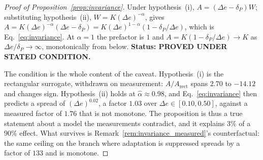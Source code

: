 \begin{proof}[Proof of Proposition~\ref{prop:invariance}]
  Under hypothesis~(i), $A = (\Delta e - \delta_P)W$; substituting
  hypothesis~(ii), $W = K(\Delta e)^{-\alpha}$, gives
  $A = K(\Delta e)^{-\alpha}(\Delta e - \delta_P) =
  K(\Delta e)^{1-\alpha}(1 - \delta_P/\Delta e)$, which is
  Eq.~\eqref{eq:invariance}. At $\alpha = 1$ the prefactor is $1$ and
  $A = K(1 - \delta_P/\Delta e) \to K$ as $\Delta e/\delta_P \to \infty$,
  monotonically from below. \textbf{Status: PROVED UNDER STATED CONDITION.}

  The condition is the whole content of the caveat. Hypothesis~(i) is the
  rectangular surrogate, withdrawn on measurement: $A/A_{\mathrm{rect}}$ spans
  $2.70$ to $-14.12$ and changes sign. Hypothesis~(ii) holds at
  $\hat\alpha \approx 0.98$, and Eq.~\eqref{eq:invariance} then predicts a
  spread of $(\Delta e)^{0.02}$, a factor $1.03$ over
  $\Delta e \in [0.10, 0.50]$, against a measured factor of $1.76$ that is not
  monotone. The proposition is thus a true statement about a model the measurements contradict, and it explains $3\%$ of a $90\%$ effect. What
  survives is Remark~\ref{rem:invariance_measured}'s counterfactual: the same
  ceiling on the branch where adaptation is suppressed spreads by a factor of
  $133$ and is monotone.
\end{proof}

